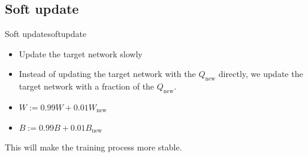\subsection*{Soft update}
\begin{thmbox}{Soft update}{softupdate}
    \begin{itemize}
        \item Update the target network slowly
        \item Instead of updating the target network with the $Q_{\mathrm{new}}$ directly, 
        we update the target network with a fraction of the $Q_{\mathrm{new}}$.
        \item $W := 0.99W + 0.01W_{\mathrm{new}}$
        \item $B := 0.99B + 0.01B_{\mathrm{new}}$
    \end{itemize}
    This will make the training process more stable.
\end{thmbox}
